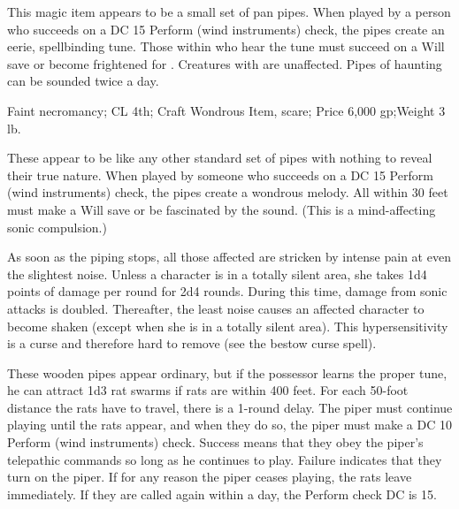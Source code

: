 {\begin{comment}
The pearl enables its possessor to breathe in water as if she were in clean, fresh air. Her swim speed is 60 feet, and she can cast spells and act underwater without hindrance.

Moderate abjuration and transmutation; CL 8th; Craft Wondrous Item, freedom of movement, water breathing; Price 15,300 gp.
\end{comment}

 This magic item appears to be a small set of pan pipes. When played by a person who succeeds on a DC 15 Perform (wind instruments) check, the pipes create an eerie, spellbinding tune. Those within  who hear the tune must succeed on a Will save or become frightened for . Creatures with  are unaffected. Pipes of haunting can be sounded twice a day.

Faint necromancy; CL 4th; Craft Wondrous Item, scare; Price 6,000 gp;Weight 3 lb.

 These appear to be like any other standard set of pipes with nothing to reveal their true nature. When played by someone who succeeds on a DC 15 Perform (wind instruments) check, the pipes create a wondrous melody. All within 30 feet must make a Will save or be fascinated by the sound. (This is a mind-affecting sonic compulsion.)

As soon as the piping stops, all those affected are stricken by intense pain at even the slightest noise. Unless a character is in a totally silent area, she takes 1d4 points of damage per round for 2d4 rounds. During this time, damage from sonic attacks is doubled. Thereafter, the least noise causes an affected character to become shaken (except when she is in a totally silent area). This hypersensitivity is a curse and therefore hard to remove (see the bestow curse spell).


 These wooden pipes appear ordinary, but if the possessor learns the proper tune, he can attract 1d3 rat swarms if rats are within 400 feet. For each 50-foot distance the rats have to travel, there is a 1-round delay. The piper must continue playing until the rats appear, and when they do so, the piper must make a DC 10 Perform (wind instruments) check. Success means that they obey the piper's telepathic commands so long as he continues to play. Failure indicates that they turn on the piper. If for any reason the piper ceases playing, the rats leave immediately. If they are called again within a day, the Perform check DC is 15.

}
